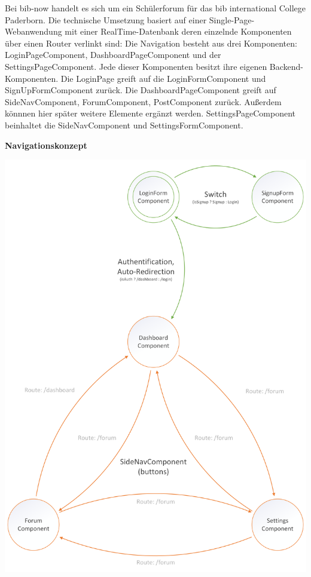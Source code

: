 \documentclass[ngerman]{scrartcl} %
\begin{document}
Bei bib-now handelt es sich um ein Schülerforum für das bib international College Paderborn. Die technische Umsetzung basiert auf  einer Single-Page-Webanwendung mit einer RealTime-Datenbank deren einzelnde Komponenten über einen Router verlinkt sind: Die Navigation besteht aus drei Komponenten: LoginPageComponent, DashboardPageComponent und der SettingsPageComponent. Jede dieser Komponenten besitzt ihre eigenen Backend-Komponenten. Die LoginPage greift auf die LoginFormComponent und SignUpFormComponent zurück. Die DashboardPageComponent greift auf  SideNavComponent, ForumComponent, PostComponent zurück. Außerdem könnnen hier später weitere Elemente ergänzt werden. SettingsPageComponent beinhaltet die SideNavComponent und SettingsFormComponent. 


\pagebreak

\textbf{Navigationskonzept}

\vspace{2cm}
\includegraphics{Konzepte/bibnow_Navigationskonzept.png}
\vspace{2cm}
\end{document}
